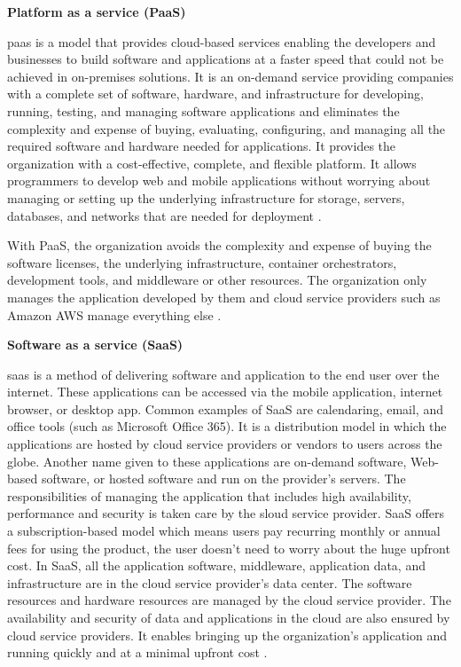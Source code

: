 \clearpage
\textbf{Platform as a service (PaaS)}
\par \gls{paas} is a model that provides cloud-based
services
enabling the developers and businesses to build software
and applications at a faster speed that could not be
achieved in on-premises solutions.
It is an on-demand service providing companies with a
complete set of software, hardware, and infrastructure for
developing, running, testing, and managing software
applications and eliminates the complexity and expense of
buying, evaluating, configuring, and managing all the
required software and hardware needed for applications.
It provides the organization with a cost-effective,
complete, and flexible platform.
It allows programmers to develop web and mobile
applications without worrying about managing or setting up the underlying infrastructure for storage, servers, databases, and networks that are needed for deployment \cite{15}.


\par With PaaS, the organization avoids the complexity and expense of buying the software licenses, the underlying infrastructure, container orchestrators, development tools, and middleware or other resources.
The organization only manages the application developed
by them and cloud service providers such as Amazon AWS
manage everything else \cite{15}.\\

\hfill \break

\textbf{Software as a service (SaaS)}
\par \gls{saas} is a method of delivering software and
application
to the end user over the internet.
These applications can be accessed via the
mobile application, internet browser, or desktop app.
Common examples of SaaS are calendaring, email, and office tools (such as Microsoft Office 365).
It is a distribution model in which the applications are hosted by cloud service providers or vendors to users across the globe.
Another name given to these applications are
on-demand
software, Web-based software, or hosted software and run
on the provider's servers.
The responsibilities of managing the application that includes high availability, performance and security is taken care by the sloud service provider.
SaaS offers a subscription-based model
which
means users pay recurring monthly or annual fees for
using the product, the user doesn’t need to worry
about the huge
upfront cost.
In SaaS, all the
application software, middleware, application data, and infrastructure are in the cloud service provider’s data center.
The software resources and hardware resources are managed
by the
cloud
service provider.
The availability and security of data and applications in the cloud are also ensured by cloud service providers.
It enables bringing up the organization’s application and
running quickly and at a minimal upfront cost \cite{15}.

